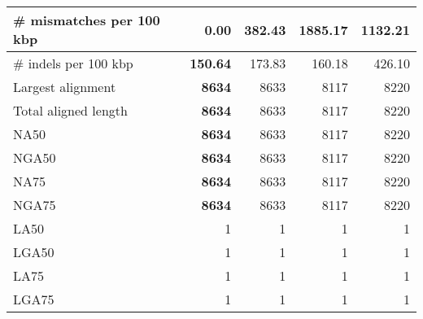 \documentclass[12pt,a4paper]{article}
\begin{document}
\begin{table}[ht]
\begin{center}
\begin{tabular}{|l*{4}{|r}|}
\# mismatches per 100 kbp & {\bf 0.00} & 382.43 & 1885.17 & 1132.21 \\ \hline
\# indels per 100 kbp & {\bf 150.64} & 173.83 & 160.18 & 426.10 \\ \hline
Largest alignment & {\bf 8634} & 8633 & 8117 & 8220 \\ \hline
Total aligned length & {\bf 8634} & 8633 & 8117 & 8220 \\ \hline
NA50 & {\bf 8634} & 8633 & 8117 & 8220 \\ \hline
NGA50 & {\bf 8634} & 8633 & 8117 & 8220 \\ \hline
NA75 & {\bf 8634} & 8633 & 8117 & 8220 \\ \hline
NGA75 & {\bf 8634} & 8633 & 8117 & 8220 \\ \hline
LA50 & 1 & 1 & 1 & 1 \\ \hline
LGA50 & 1 & 1 & 1 & 1 \\ \hline
LA75 & 1 & 1 & 1 & 1 \\ \hline
LGA75 & 1 & 1 & 1 & 1 \\ \hline
\end{tabular}
\end{center}
\end{table}
\end{document}
